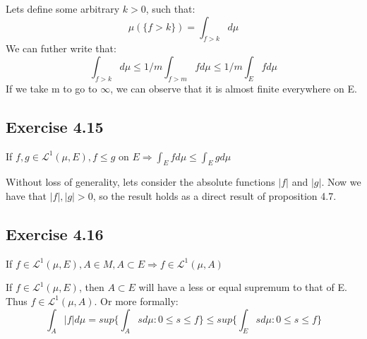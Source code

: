 \documentclass[a4paper]{article}
\begin{document}
Lets define some arbitrary $k> 0$, such that:
$$\mu(\{f > k\}) = \int_{f>k} d \mu$$
We can futher write that:
$$\int_{f>k} d \mu \leq 1/m \int_{f>m} f d\mu \leq 1/m \int_E f d\mu$$
If we take m to go to $\infty$, we can observe that it is almost finite everywhere on E.

\subsection*{Exercise 4.15}
If $f, g \in \mathcal{L}^1 (\mu, E), f \leq g$ on $E \Rightarrow  \int_E f d \mu \leq \int_E g d\mu$

Without loss of generality, lets consider the absolute functions $
|f|$ and $|g|$. Now we have that $|f|,|g| > 0$, so the result holds as  a direct result of proposition 4.7.


\subsection*{Exercise 4.16}
If $f \in \mathcal{L}^1 (\mu, E), A \in M, A\subset E \Rightarrow f \in \mathcal{L}^1 (\mu, A)$

If $f \in \mathcal{L}^1 (\mu, E)$, then $A\subset E$ will have a less or equal supremum to that of E. Thus $f\in\mathcal{L}^1 (\mu, A)$. Or more formally:
$$\int_A |f| d \mu  = sup\{\int_A s d \mu: 0 \leq s \leq f\} \leq sup\{\int_E s d \mu: 0 \leq s \leq f\} $$
\end{document}
